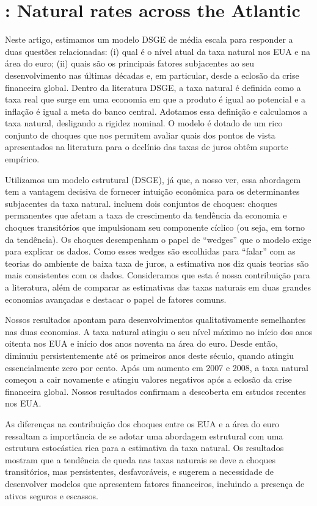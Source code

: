 \documentclass[11pt,oneside,a4paper]{article}
\begin{document}
\section{\citet{Neri:2018}: Natural rates across the Atlantic }

Neste artigo, estimamos um modelo DSGE de média escala para responder a duas questões relacionadas: (i) qual é o nível atual da taxa natural nos EUA e na área do euro; (ii) quais são os principais fatores subjacentes ao seu desenvolvimento nas últimas décadas e, em particular, desde a eclosão da crise financeira global. Dentro da literatura DSGE, a taxa natural é definida como a taxa real que surge em uma economia em que a produto é igual ao potencial e a inflação é igual a meta do banco central. Adotamos essa definição e calculamos a taxa natural, desligando a rigidez nominal. O modelo é dotado de um rico conjunto de choques que nos permitem avaliar quais dos pontos de vista apresentados na literatura para o declínio das taxas de juros obtêm suporte empírico.

Utilizamos um modelo estrutural (DSGE), já que, a nosso ver, essa abordagem tem a vantagem decisiva de fornecer intuição econômica para os determinantes subjacentes da taxa natural. incluem dois conjuntos de choques: choques permanentes que afetam a taxa de crescimento da tendência da economia e choques transitórios que impulsionam seu componente cíclico (ou seja, em torno da tendência). Os choques desempenham o papel de “wedges” que o modelo exige para explicar os dados. Como esses wedges são escolhidas para “falar” com as teorias do ambiente de baixa taxa de juros, a estimativa nos diz quais teorias são mais consistentes com os dados. Consideramos que esta é nossa contribuição para a literatura, além de comparar as estimativas das taxas naturais em duas grandes economias avançadas e destacar o papel de fatores comuns.

Nossos resultados apontam para desenvolvimentos qualitativamente semelhantes nas duas economias. A taxa natural atingiu o seu nível máximo no início dos anos oitenta nos EUA e início dos anos noventa na área do euro. Desde então, diminuiu persistentemente até os primeiros anos deste século, quando atingiu essencialmente zero por cento. Após um aumento em 2007 e 2008, a taxa natural começou a cair novamente e atingiu valores negativos após a eclosão da crise financeira global. Nossos resultados confirmam a descoberta em estudos recentes nos EUA.

As diferenças na contribuição dos choques entre os EUA e a área do euro ressaltam a importância de se adotar uma abordagem estrutural com uma estrutura estocástica rica para a estimativa da taxa natural. Os resultados mostram que a tendência de queda nas taxas naturais se deve a choques transitórios, mas persistentes, desfavoráveis, e sugerem a necessidade de desenvolver modelos que apresentem fatores financeiros, incluindo a presença de ativos seguros e escassos.
\end{document}
